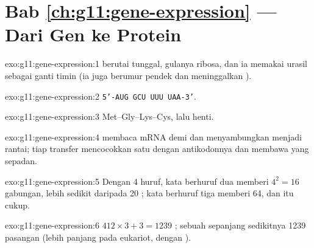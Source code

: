 \section*{Bab \ref{ch:g11:gene-expression} --- Dari Gen ke Protein}

\begin{solution}{exo:g11:gene-expression:1}
 berutai tunggal, gulanya ribosa, dan ia memakai urasil sebagai
ganti timin (ia juga berumur pendek dan meninggalkan ).
\end{solution}

\begin{solution}{exo:g11:gene-expression:2}
\texttt{5'-AUG GCU UUU UAA-3'}.
\end{solution}

\begin{solution}{exo:g11:gene-expression:3}
Met--Gly--Lys--Cys, lalu henti.
\end{solution}

\begin{solution}{exo:g11:gene-expression:4}
 membaca mRNA  demi  dan menyambungkan  menjadi rantai; tiap  transfer mencocokkan satu 
dengan antikodonnya dan membawa  yang sepadan.
\end{solution}

\begin{solution}{exo:g11:gene-expression:5}
Dengan 4 huruf, kata berhuruf dua memberi $4^2 = 16$ gabungan, lebih
sedikit daripada 20 ; kata berhuruf tiga memberi 64, dan itu cukup.
\end{solution}

\begin{solution}{exo:g11:gene-expression:6}
$412 \times 3 + 3 = 1239$ ; sebuah  sepanjang sedikitnya
1239 pasangan  (lebih panjang pada eukariot, dengan ).
\end{solution}

